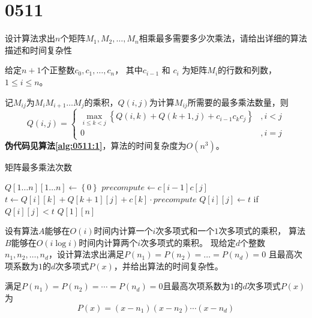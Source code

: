\section{0511}\label{sec:0511}
\begin{questions}
    \question 设计算法求出$n$个矩阵$M_1, M_2, \dots ,M_n$相乘最多需要多少次乘法，请给出详细的算法描述和时间复杂性

    \begin{solution}
        给定$n+1$个正整数$c_0,c_1, \dots , c_{n}$，
        其中$c_{i-1}$ 和 $c_{i}$ 为矩阵$M_i$的行数和列数，$1 \le i \le n$。

        记$M_{ij}$为$M_iM_{i+1} \dots M_j$的乘积，$Q(i,j)$为计算$M_{ij}$所需要的最多乘法数量，则
        \[
            Q(i,j) = \begin{cases}
                \max_{i \le k < j}{ \left\{ Q(i, k) + Q(k+1, j) + c_{i-1} c_k c_{j} \right\} } & , i < j \\
                0                                                                              & , i = j
            \end{cases}
        \]
        \textbf{伪代码见算法\ref{alg:0511:1}}，算法的时间复杂度为$O(n^3)$。
    \end{solution}

    \begin{algorithm}[!htp]
        \caption{矩阵最多乘法次数}\label{alg:0511:1}
        \begin{algorithmic}[1]
            \State $Q[1 \dots n][1 \dots n] \gets \left\{0\right\}$
            \State $precompute \gets c[i-1]c[j]$
            \State $t \gets Q[i][k] + Q[k+1][j] + c[k] \cdot precompute$
            \State $Q[i][j] \gets t$ if $Q[i][j] < t$
            \EndFor
            \EndFor
            \EndFor
            \State \Return $Q[1][n]$
        \end{algorithmic}
    \end{algorithm}

    \question 设有算法$A$能够在$O(i)$时间内计算一个$i$次多项式和一个$1$次多项式的乘积，
    算法$B$能够在$O(i \log i)$时间内计算两个$i$次多项式的乘积。
    现给定$d$个整数$n_1,n_2, \dots ,n_d$，设计算法求出满足$P(n_1)=P(n_2)= \dots =P(n_d)=0$
    且最高次项系数为$1$的$d$次多项式$P(x)$，并给出算法的时间复杂性。

    \begin{solution}
        满足$P(n_1)=P(n_2)= \cdots =P(n_d)=0$且最高次项系数为$1$的$d$次多项式$P(x)$为
        \[
            P(x) = (x-n_1)(x-n_2) \cdots (x-n_d)
        \]


\end{solution}
\end{questions}
